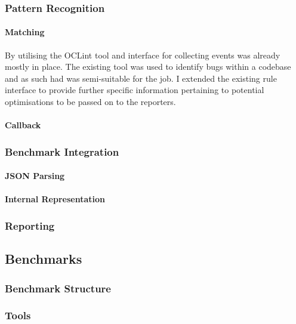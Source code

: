\subsubsection{Pattern Recognition}
\paragraph{Matching}
By utilising the OCLint tool and interface for collecting events was already mostly in place. The
existing tool was used to identify bugs within a codebase and as such had was semi-suitable for the
job. I extended the existing rule interface to provide further specific information pertaining to
potential optimisations to be passed on to the reporters.

\paragraph{Callback}


\subsubsection{Benchmark Integration}
\paragraph{JSON Parsing}

\paragraph{Internal Representation}





\subsubsection{Reporting}


\subsection{Benchmarks}
\subsubsection{Benchmark Structure}

\subsubsection{Tools}


